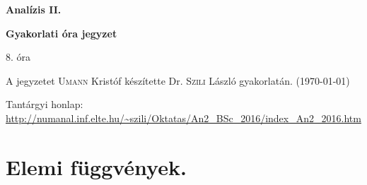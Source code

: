 \documentclass[a4paper,11.5pt]{article}
\begin{document}
	\setlength\parindent{0pt}
	\def\s{\hspace{0.2mm}\vphantom{\beta}}
	\def\Z{\mathbb{Z}}
	\def\Q{\mathbb{Q}}
	\def\R{\mathbb{R}}
	\def\C{\mathbb{C}}
	\def\N{\mathbb{N}}
	\def\Rn{\mathbb{R}^{n}}
	\def\Ra{\overline{\mathbb{R}}}
	\def\sume{\displaystyle\sum_{n=1}^{+\infty}}
	\def\sumn{\displaystyle\sum_{n=0}^{+\infty}}
	\def\biz{\emph{Bizonyítás:\ }}
	\def\narrow{\underset{n\rightarrow+\infty}{\longrightarrow}}
	\def\limn{\displaystyle\lim_{n\to +\infty}}
	\def\limx{\displaystyle\lim_{x\to +\infty}}
	
	\theoremstyle{definition}
	\newtheorem{theorem}{Tétel}[subsection] %
	
	\theoremstyle{definition}
	\newtheorem{definition}[theorem]{Definíció} %
	\newtheorem{example}[theorem]{Példa} %
	\newtheorem{task}[theorem]{Feladat} %
	\newtheorem{note}[theorem]{Megjegyzés} %
	\newtheorem{revision}[theorem]{Emlékeztető} %
	\begin{center}
		{\LARGE \textbf{Analízis II.}}
		
		{\large \textbf{Gyakorlati óra jegyzet}}
		
		8. óra
	\end{center}
	A jegyzetet \textsc{Umann} Kristóf készítette Dr. \textsc{Szili} László gyakorlatán. (\today)
	
	Tantárgyi honlap: \url{http://numanal.inf.elte.hu/~szili/Oktatas/An2_BSc_2016/index_An2_2016.htm}
	\section{Elemi függvények.}
\end{document}
